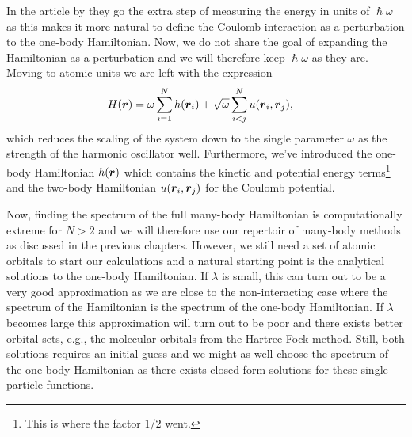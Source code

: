         In the article by \citeauthor{anisimovas1998energy}
        \cite{anisimovas1998energy} they go the extra step of measuring the
        energy in units of $\hslash\omega$ as this makes it more natural to
        define the Coulomb interaction as a perturbation to the one-body
        Hamiltonian.
        Now, we do not share the goal of expanding the Hamiltonian as a
        perturbation and we will therefore keep $\hslash\omega$ as they are.
        Moving to atomic units we are left with the expression
        \begin{align}
            H(\boldsymbol{r})
            &= \omega \sum_{i = 1}^{N}
            h(\boldsymbol{r}_i)
            + \sqrt{\omega} \sum_{i < j}^{N} u(\boldsymbol{r}_i, \boldsymbol{r}_j),
            \label{eq:tdho-hamiltonian}
        \end{align}
        which reduces the scaling of the system down to the single parameter
        $\omega$ as the strength of the harmonic oscillator well.
        Furthermore, we've introduced the one-body Hamiltonian
        $h(\boldsymbol{r})$ which contains the kinetic and potential energy
        terms\footnote{%
            This is where the factor $1/2$ went.
        } and the two-body Hamiltonian $u(\boldsymbol{r}_i, \boldsymbol{r}_j)$ for the
        Coulomb potential.

        Now, finding the spectrum of the full many-body Hamiltonian is
        computationally extreme for $N > 2$ and we will therefore use our
        repertoir of many-body methods as discussed in the previous chapters.
        However, we still need a set of atomic orbitals to start our
        calculations and a natural starting point is the analytical solutions to
        the one-body Hamiltonian.
        If $\lambda$ is small, this can turn out to be a very good approximation
        as we are close to the non-interacting case where the spectrum of the
        Hamiltonian is the spectrum of the one-body Hamiltonian.
        If $\lambda$ becomes large this approximation will turn out to be poor
        and there exists better orbital sets, e.g., the molecular orbitals from
        the Hartree-Fock method.
        Still, both solutions requires an initial guess and we might as well
        choose the spectrum of the one-body Hamiltonian as there exists closed
        form solutions for these single particle functions.

